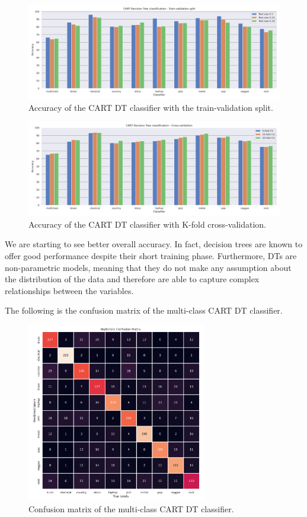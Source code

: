 \documentclass{Configuration_Files/PoliMi3i_thesis}
\begin{document}
\begin{figure}[H]
    \centering
    \includegraphics[width=\textwidth]{Figures/dtree_s.png}
    \caption{Accuracy of the CART DT classifier with the train-validation split.}
    \label{fig:dtrees}
\end{figure}

\begin{figure}[H]
    \centering
    \includegraphics[width=\textwidth]{Figures/dtree_d.png}
    \caption{Accuracy of the CART DT classifier with K-fold cross-validation.}
    \label{fig:dtreed}
\end{figure}

We are starting to see better overall accuracy. In fact, decision trees are known to offer good performance despite their short training phase. Furthermore, DTs are non-parametric models, meaning that they do not make any assumption about the distribution of the data and therefore are able to capture complex relationships between the variables.

The following is the confusion matrix of the multi-class CART DT classifier.

\begin{figure}[H]
    \centering
    \includegraphics[width=0.7\textwidth]{Figures/dtree_m.png}
    \caption{Confusion matrix of the multi-class CART DT classifier.}
    \label{fig:dtreem}
\end{figure}
\end{document}
